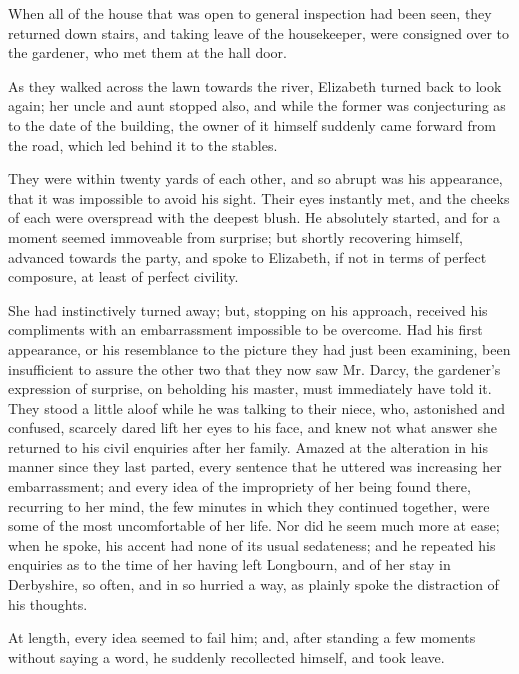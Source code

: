 When all of the house that was open to general inspection
had been seen, they returned down stairs, and taking
leave of the housekeeper, were consigned over to the
gardener, who met them at the hall door.

As they walked across the lawn towards the river,
Elizabeth turned back to look again; her uncle and aunt
stopped also, and while the former was conjecturing as
to the date of the building, the owner of it himself suddenly
came forward from the road, which led behind it to the
stables.

They were within twenty yards of each other, and so
abrupt was his appearance, that it was impossible to avoid
his sight. Their eyes instantly met, and the cheeks of
each were overspread with the deepest blush. He absolutely
started, and for a moment seemed immoveable from
surprise; but shortly recovering himself, advanced towards
the party, and spoke to Elizabeth, if not in terms of perfect
composure, at least of perfect civility.

She had instinctively turned away; but, stopping on
his approach, received his compliments with an embarrassment
impossible to be overcome. Had his first
appearance, or his resemblance to the picture they had
just been examining, been insufficient to assure the other
two that they now saw Mr. Darcy, the gardener’s expression
of surprise, on beholding his master, must immediately
have told it. They stood a little aloof while he was talking
to their niece, who, astonished and confused, scarcely
dared lift her eyes to his face, and knew not what answer
she returned to his civil enquiries after her family. Amazed
at the alteration in his manner since they last parted,
every sentence that he uttered was increasing her embarrassment;
and every idea of the impropriety of her being
found there, recurring to her mind, the few minutes in
which they continued together, were some of the most
uncomfortable of her life. Nor did he seem much more
at ease; when he spoke, his accent had none of its usual
sedateness; and he repeated his enquiries as to the time
of her having left Longbourn, and of her stay in Derbyshire,
so often, and in so hurried a way, as plainly spoke
the distraction of his thoughts.

At length, every idea seemed to fail him; and, after
standing a few moments without saying a word, he suddenly
recollected himself, and took leave.

